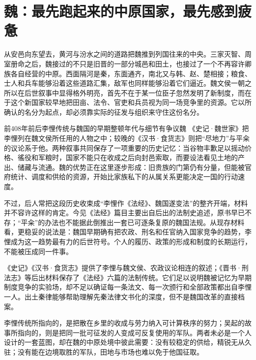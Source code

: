 \section{魏：最先跑起来的中原国家，最先感到疲惫}

从安邑向东望去，黄河与汾水之间的道路把魏推到列国往来的中央。三家灭智、周室册命之后，魏接过的不只是旧晋的一部分城邑和田土，也接过了一个不再容许卿族各自经营的中原。西面隔河是秦，东面通齐，南北又与韩、赵、楚相接；粮食、士人和兵车能够沿着这些道路汇集，敌军也同样能够沿着它们逼近。魏文侯一朝之所以在后世叙事中显得格外明亮，首先不在于某一位臣子忽然发明了新制度，而在于这个新国家较早地把田亩、法令、官吏和兵员视为同一场竞争里的资源。它以所确认的名分为起点，却必须靠实际的征发与组织来守住这份名分。

\begin{event}{前408年前后}{李悝传统与魏国的早期整顿}{年代与细节有争议}{魏}
《史记·魏世家》把李悝列在魏文侯所任用的人物之中；较晚的《汉书·食货志》则把“尽地力”与平籴的议论系于他。两种叙事共同保存了一项重要的历史记忆：当谷物丰歉足以摇动价格、徭役和军粮时，国家不能只在收成之后向封邑索取，而要设法看见土地的产出、储藏与流通。魏的优势正在这里逐步形成：旧贵族的门第仍有分量，但能被官府统计、调度和供给的资源，开始比家族私下的从属关系更能决定一国的行动速度。

不过，后人常把这段历史收束成“李悝作《法经》、魏国遂变法”的整齐开端，材料并不容许这样的肯定。今见《法经》篇目主要出自后出的法制史追述，原书早已不存；“平籴”的办法也不能据此倒推出一套已可逐条复原的魏国法规。从现存材料看，更稳妥的说法是：魏国早期确有把农政、刑名和任官纳入国家竞争的趋势，李悝成为这一趋势最有力的后世符号。个人的履历、政策的形成和制度的长期运行，不能被压成同一件事。
\end{event}

\begin{debate}
《史记》《汉书·食货志》提供了李悝与魏文侯、农政议论相连的叙述；《晋书·刑法志》等后出材料保存了《法经》六篇的法制传统。它们足以说明魏被记忆为早期制度竞争的实验场，却不足以确证每一条法文、每一次颁行和全部政策都出自李悝一人。出土秦律能够帮助理解先秦法律文书化的深度，但不是魏国改革的直接档案。
\end{debate}

李悝传统所指向的，是把散在乡里的收成与劳力纳入可计算秩序的努力；吴起的故事所指向的，则是把同一批可征发的人变成可反复使用的军队。两者未必是一个人设计的一套蓝图，却在魏的中原处境中彼此需要：没有较稳定的供给，精锐无从久驻；没有能在边境取胜的军队，田地与市场也难以免于他国征取。

